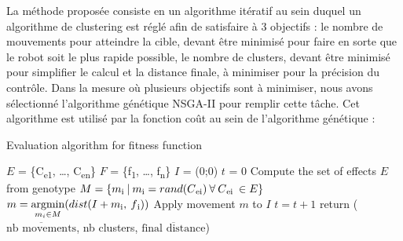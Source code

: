\documentclass[draft]{llncs}
\newcommand{\textoverline}[1]{$\overline{\mbox{#1}}$}
\newcommand*\circled[1]{\tikz[baseline=(char.base)]{\node[shape=circle,draw,inner sep=2pt] (char) {#1};}}
\begin{document}
La méthode proposée consiste en un algorithme itératif au sein duquel un algorithme de clustering est réglé afin de satisfaire à 3 objectifs : \circled{1} le nombre de mouvements pour atteindre la cible, devant être minimisé pour faire en sorte que le robot soit le plus rapide possible, \circled{2} le nombre de clusters, devant être minimisé pour simplifier le calcul et \circled{3} la distance finale, à minimiser pour la précision du contrôle.
Dans la mesure où plusieurs objectifs sont à minimiser, nous avons sélectionné l'algorithme génétique NSGA-II\cite{Deb:2002:FEM:2221359.2221582} pour remplir cette tâche.
Cet algorithme est utilisé par la fonction coût au sein de l'algorithme génétique :


      \begin{algorithm}[H]
      \caption{Evaluation algorithm for fitness function}\label{euclid}
        \begin{algorithmic}[1]
          \State $E$ = \{C\textsubscript{e1}, \dots, C\textsubscript{en}\} 
          \State $F$ = \{f\textsubscript{1}, \dots, f\textsubscript{n}\} 
          \State $I$ = (0;0) 
          \State $t$ = 0 
          \State Compute the set of effects $E$ from genotype
                  \State $M = \{ m\textsubscript{i}\:|\:m\textsubscript{i} = rand(C\textsubscript{ei})\:\forall\:C\textsubscript{ei}\:\in E\}$
                  \State $m = \operatornamewithlimits{argmin}\limits_{m_i \in M}(dist(I+m\textsubscript{i},\:f\textsubscript{i}))$
                  \State Apply movement $m$ to $I$
                  \State $t = t + 1$
                \EndWhile
              \EndFor
            \EndFor
            \State return (\textoverline{nb movements}, nb clusters, \textoverline{final distance})
        \end{algorithmic}
      \end{algorithm}
\end{document}
